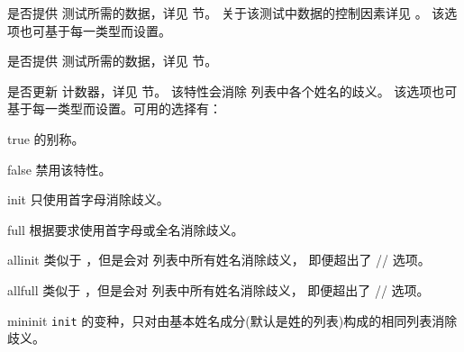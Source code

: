 \begin{optionlist}


是否提供  测试所需的数据，详见  节。
关于该测试中数据的控制因素详见 。
该选项也可基于每一类型而设置。



是否提供  测试所需的数据，详见  节。



是否更新  计数器，详见  节。
该特性会消除  列表中各个姓名的歧义。
该选项也可基于每一类型而设置。可用的选择有：

\begin{valuelist}
\item[true] %
 的别称。
\item[false] %
禁用该特性。
\item[init] %
只使用首字母消除歧义。
\item[full] %
根据要求使用首字母或全名消除歧义。
\item[allinit] %
类似于 ，但是会对  列表中所有姓名消除歧义，
即便超出了 \slash {}\slash {} 选项。
\item[allfull] %
类似于 ，但是会对  列表中所有姓名消除歧义，
即便超出了 \slash {}\slash {} 选项。
\item[mininit] %
\texttt{init} 的变种，只对由基本姓名成分(默认是姓的列表)构成的相同列表消除歧义。


\end{valuelist}
\end{optionlist}
